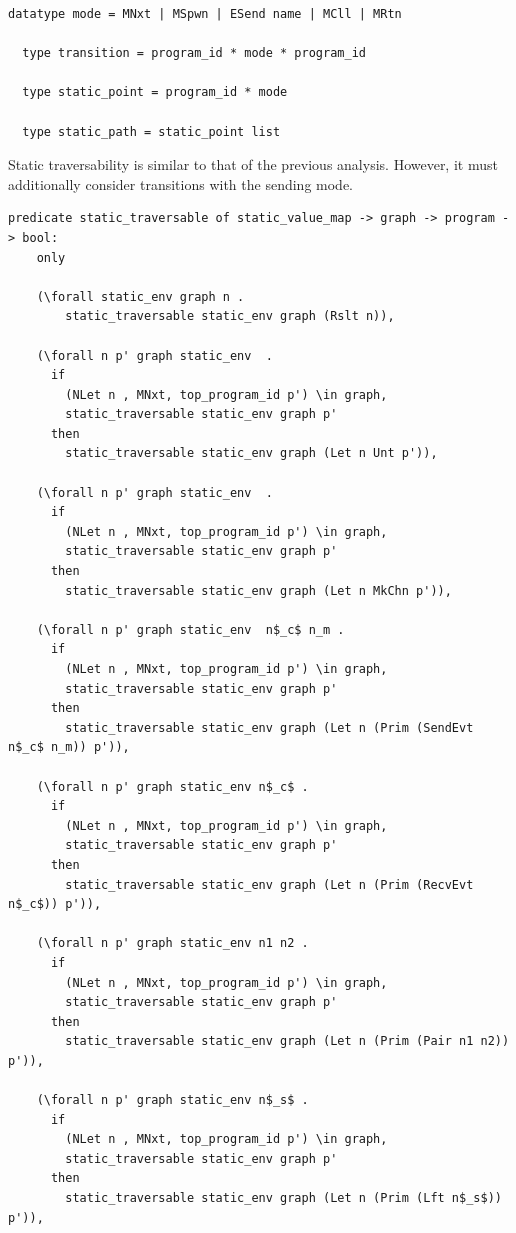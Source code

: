 \documentclass{article}
\begin{document}
\begin{lstlisting}[language=logic, mathescape]
  datatype mode = MNxt | MSpwn | ESend name | MCll | MRtn

  type transition = program_id * mode * program_id

  type static_point = program_id * mode

  type static_path = static_point list
\end{lstlisting}

Static traversability is similar to that of the previous analysis.
However, it must additionally consider transitions with the sending mode. 

\begin{lstlisting}[language=logic, mathescape]
  predicate static_traversable of static_value_map -> graph -> program -> bool:
    only
    
    (\forall static_env graph n .
        static_traversable static_env graph (Rslt n)),

    (\forall n p' graph static_env  .
      if
        (NLet n , MNxt, top_program_id p') \in graph,
        static_traversable static_env graph p'
      then
        static_traversable static_env graph (Let n Unt p')),

    (\forall n p' graph static_env  .
      if
        (NLet n , MNxt, top_program_id p') \in graph,
        static_traversable static_env graph p'
      then
        static_traversable static_env graph (Let n MkChn p')),

    (\forall n p' graph static_env  n$_c$ n_m .
      if
        (NLet n , MNxt, top_program_id p') \in graph,
        static_traversable static_env graph p'
      then
        static_traversable static_env graph (Let n (Prim (SendEvt n$_c$ n_m)) p')),

    (\forall n p' graph static_env n$_c$ .
      if
        (NLet n , MNxt, top_program_id p') \in graph,
        static_traversable static_env graph p'
      then
        static_traversable static_env graph (Let n (Prim (RecvEvt n$_c$)) p')),

    (\forall n p' graph static_env n1 n2 .
      if
        (NLet n , MNxt, top_program_id p') \in graph,
        static_traversable static_env graph p'
      then
        static_traversable static_env graph (Let n (Prim (Pair n1 n2)) p')),

    (\forall n p' graph static_env n$_s$ .
      if
        (NLet n , MNxt, top_program_id p') \in graph,
        static_traversable static_env graph p'
      then
        static_traversable static_env graph (Let n (Prim (Lft n$_s$)) p')),


\end{lstlisting}
\end{document}
